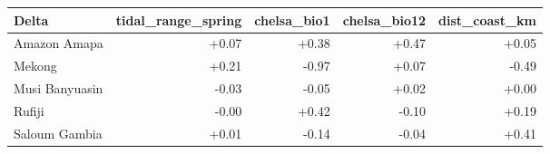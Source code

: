 \begin{tabular}{lrrrr}
\toprule
Delta & tidal\_range\_spring & chelsa\_bio1 & chelsa\_bio12 & dist\_coast\_km \\
\midrule
Amazon Amapa & +0.07 & +0.38 & +0.47 & +0.05 \\
Mekong & +0.21 & -0.97 & +0.07 & -0.49 \\
Musi Banyuasin & -0.03 & -0.05 & +0.02 & +0.00 \\
Rufiji & -0.00 & +0.42 & -0.10 & +0.19 \\
Saloum Gambia & +0.01 & -0.14 & -0.04 & +0.41 \\
\bottomrule
\end{tabular}
